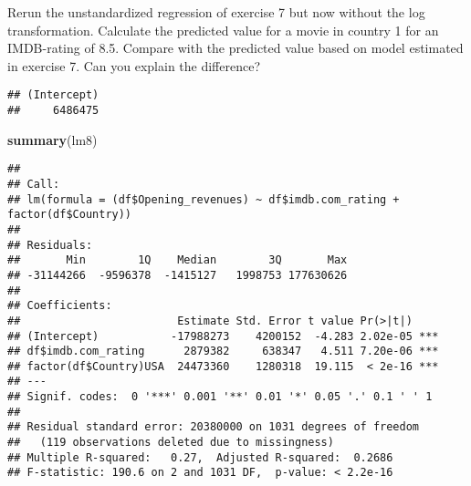 \documentclass[
]{article}
\newenvironment{Shaded}{\begin{snugshade}}{\end{snugshade}}
\newcommand{\CommentTok}[1]{\textcolor[rgb]{0.56,0.35,0.01}{\textit{#1}}}
\newcommand{\DecValTok}[1]{\textcolor[rgb]{0.00,0.00,0.81}{#1}}
\newcommand{\FloatTok}[1]{\textcolor[rgb]{0.00,0.00,0.81}{#1}}
\newcommand{\KeywordTok}[1]{\textcolor[rgb]{0.13,0.29,0.53}{\textbf{#1}}}
\newcommand{\NormalTok}[1]{#1}
\newcommand{\OperatorTok}[1]{\textcolor[rgb]{0.81,0.36,0.00}{\textbf{#1}}}
\newcommand{\StringTok}[1]{\textcolor[rgb]{0.31,0.60,0.02}{#1}}
\begin{document}
Rerun the unstandardized regression of exercise 7 but now without the
log transformation. Calculate the predicted value for a movie in country
1 for an IMDB-rating of 8.5. Compare with the predicted value based on
model estimated in exercise 7. Can you explain the difference?

\begin{Shaded}
\end{Shaded}

\begin{verbatim}
## (Intercept) 
##     6486475
\end{verbatim}

\begin{Shaded}
\begin{Highlighting}[]
\KeywordTok{summary}\NormalTok{(lm8)}
\end{Highlighting}
\end{Shaded}

\begin{verbatim}
## 
## Call:
## lm(formula = (df$Opening_revenues) ~ df$imdb.com_rating + factor(df$Country))
## 
## Residuals:
##       Min        1Q    Median        3Q       Max 
## -31144266  -9596378  -1415127   1998753 177630626 
## 
## Coefficients:
##                        Estimate Std. Error t value Pr(>|t|)    
## (Intercept)           -17988273    4200152  -4.283 2.02e-05 ***
## df$imdb.com_rating      2879382     638347   4.511 7.20e-06 ***
## factor(df$Country)USA  24473360    1280318  19.115  < 2e-16 ***
## ---
## Signif. codes:  0 '***' 0.001 '**' 0.01 '*' 0.05 '.' 0.1 ' ' 1
## 
## Residual standard error: 20380000 on 1031 degrees of freedom
##   (119 observations deleted due to missingness)
## Multiple R-squared:   0.27,  Adjusted R-squared:  0.2686 
## F-statistic: 190.6 on 2 and 1031 DF,  p-value: < 2.2e-16
\end{verbatim}
\end{document}
